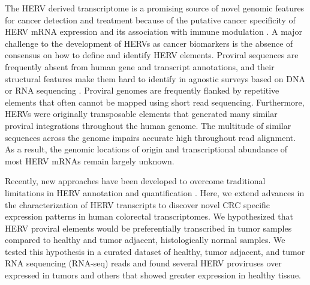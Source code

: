 The HERV derived transcriptome is a promising source of novel genomic features for cancer detection and treatment because of the putative cancer specificity of HERV mRNA expression and its association with immune modulation \citep{Chiappinelli2015, Roulois2015, Desai2017, Solovyov2018}.
A major challenge to the development of HERVs as cancer biomarkers is the absence of consensus on how to define and identify HERV elements.
Proviral sequences are frequently absent from human gene and transcript annotations, and their structural features make them hard to identify in agnostic surveys based on DNA or RNA sequencing \citep{ERVmap2018, Treangen2011}.
Proviral genomes are frequently flanked by repetitive elements that often cannot be mapped using short read sequencing.
Furthermore, HERVs were originally transposable elements that generated many similar proviral integrations throughout the human genome.
The multitude of similar sequences across the genome impairs accurate high throughout read alignment.
As a result, the genomic locations of origin and transcriptional abundance of most HERV mRNAs remain largely unknown.

Recently, new approaches have been developed to overcome traditional limitations in HERV annotation and quantification \citep{Attig2017, Attig2019, ERVmap2018, Telescope2019, Grabski2020}.
Here, we extend advances in the characterization of HERV transcripts to discover novel CRC specific expression patterns in human colorectal transcriptomes.
We hypothesized that HERV proviral elements would be preferentially transcribed in tumor samples compared to healthy and tumor adjacent, histologically normal samples.
We tested this hypothesis in a curated dataset of healthy, tumor adjacent, and tumor RNA sequencing (RNA-seq) reads and found several HERV proviruses over expressed in tumors and others that showed greater expression in healthy tissue.
